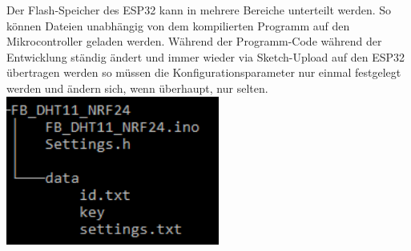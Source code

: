 \documentclass[
  12pt, %
  a4paper, %
  twoside, %
  openany, %
  numbers=noenddot, %
  BCOR=5mm, %
  parskip=half*, %
  thesis, %
]{bfhbook}
\begin{document}
\begin{center}
    \begin{minipage}[t]{0.45\textwidth}
    \captionsetup{justification=centering}
\end{minipage}\hfill
    \begin{minipage}[t]{0.45\textwidth}
       Der Flash-Speicher des ESP32 kann in mehrere Bereiche unterteilt werden. So können Dateien unabhängig von dem kompilierten Programm auf den Mikrocontroller geladen werden. Während der Programm-Code während der Entwicklung ständig ändert und immer wieder via Sketch-Upload auf den ESP32 übertragen werden so müssen die Konfigurationsparameter nur einmal festgelegt werden und ändern sich, wenn überhaupt, nur selten.
       \includegraphics[width=7cm, left]{Bilder/Firebettle-Project-FolderAndFiles.png}
    \end{minipage}
\end{center}
%
\end{document}
